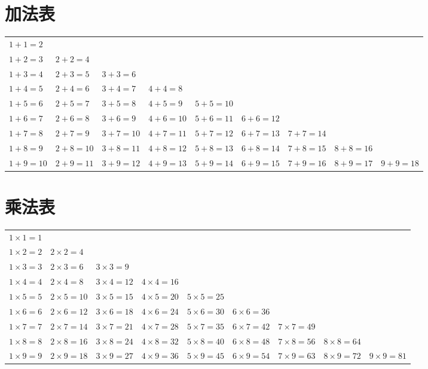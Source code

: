 \documentclass[24pt]{article}
\begin{document}
{
 \large
\section{加法表}

    {
    \begin{tabular}{ p{2.5cm}p{2.5cm}p{2.5cm}p{2.5cm}p{2.5cm}p{2.5cm}p{2.5cm}p{2.5cm}p{2.5cm} }
    
    $1 + 1 = 2$ &  &  &  &  &  &  &  & \\
$1 + 2 = 3$ & $2 + 2 = 4$ &  &  &  &  &  &  & \\
$1 + 3 = 4$ & $2 + 3 = 5$ & $3 + 3 = 6$ &  &  &  &  &  & \\
$1 + 4 = 5$ & $2 + 4 = 6$ & $3 + 4 = 7$ & $4 + 4 = 8$ &  &  &  &  & \\
$1 + 5 = 6$ & $2 + 5 = 7$ & $3 + 5 = 8$ & $4 + 5 = 9$ & $5 + 5 = 10$ &  &  &  & \\
$1 + 6 = 7$ & $2 + 6 = 8$ & $3 + 6 = 9$ & $4 + 6 = 10$ & $5 + 6 = 11$ & $6 + 6 = 12$ &  &  & \\
$1 + 7 = 8$ & $2 + 7 = 9$ & $3 + 7 = 10$ & $4 + 7 = 11$ & $5 + 7 = 12$ & $6 + 7 = 13$ & $7 + 7 = 14$ &  & \\
$1 + 8 = 9$ & $2 + 8 = 10$ & $3 + 8 = 11$ & $4 + 8 = 12$ & $5 + 8 = 13$ & $6 + 8 = 14$ & $7 + 8 = 15$ & $8 + 8 = 16$ & \\
$1 + 9 = 10$ & $2 + 9 = 11$ & $3 + 9 = 12$ & $4 + 9 = 13$ & $5 + 9 = 14$ & $6 + 9 = 15$ & $7 + 9 = 16$ & $8 + 9 = 17$ & $9 + 9 = 18$
    
    \end{tabular}
    }
    \section{乘法表}

    {
    \begin{tabular}{ p{2.5cm}p{2.5cm}p{2.5cm}p{2.5cm}p{2.5cm}p{2.5cm}p{2.5cm}p{2.5cm}p{2.5cm} }
    
    $1 \times 1 = 1$ &  &  &  &  &  &  &  & \\
$1 \times 2 = 2$ & $2 \times 2 = 4$ &  &  &  &  &  &  & \\
$1 \times 3 = 3$ & $2 \times 3 = 6$ & $3 \times 3 = 9$ &  &  &  &  &  & \\
$1 \times 4 = 4$ & $2 \times 4 = 8$ & $3 \times 4 = 12$ & $4 \times 4 = 16$ &  &  &  &  & \\
$1 \times 5 = 5$ & $2 \times 5 = 10$ & $3 \times 5 = 15$ & $4 \times 5 = 20$ & $5 \times 5 = 25$ &  &  &  & \\
$1 \times 6 = 6$ & $2 \times 6 = 12$ & $3 \times 6 = 18$ & $4 \times 6 = 24$ & $5 \times 6 = 30$ & $6 \times 6 = 36$ &  &  & \\
$1 \times 7 = 7$ & $2 \times 7 = 14$ & $3 \times 7 = 21$ & $4 \times 7 = 28$ & $5 \times 7 = 35$ & $6 \times 7 = 42$ & $7 \times 7 = 49$ &  & \\
$1 \times 8 = 8$ & $2 \times 8 = 16$ & $3 \times 8 = 24$ & $4 \times 8 = 32$ & $5 \times 8 = 40$ & $6 \times 8 = 48$ & $7 \times 8 = 56$ & $8 \times 8 = 64$ & \\
$1 \times 9 = 9$ & $2 \times 9 = 18$ & $3 \times 9 = 27$ & $4 \times 9 = 36$ & $5 \times 9 = 45$ & $6 \times 9 = 54$ & $7 \times 9 = 63$ & $8 \times 9 = 72$ & $9 \times 9 = 81$
    
    \end{tabular}
    }
    
}
\end{document}
